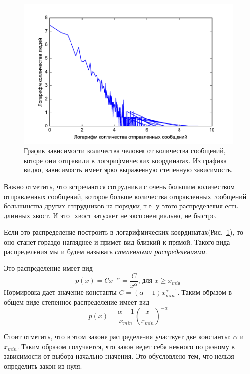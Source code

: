 \begin{figure}[H]
 \includegraphics{recources/mailes_by_people_enron}
 \caption{График зависимости количества человек от количества сообщений, которе они отправили в логарифмических координатах. Из графика видно, зависимость имеет ярко выраженную степенную зависимость.}
 \label{fig:enron_mails_by_people}
\end{figure}

Важно отметить, что встречаются сотрудники с очень большим количеством отправленных сообщений, которое больше количества отправленных сообщений большинства других сотрудников на порядки, т.е. у этого распределения есть длинных хвост. И этот хвост затухает не экспоненциально, не быстро. 

Если это распределение построить в логарифмических координатах(Рис.~\ref{fig:enron_mails_by_people}), то оно станет гораздо нагляднее и примет вид близкий к прямой. Такого вида распределения мы и будем называть \textit{степенными распределениями}. 

Это распределение имеет вид \cite{zhukov} $$ p(x) = Cx^{-\alpha} = \frac{C}{x^\alpha} \text{, для } x \ge x_{min} $$ 
Нормировка дает значение константы $C = (\alpha - 1) x_{min}^{\alpha - 1}$.
Таким образом в общем виде степенное распределение имеет вид $$p(x) = \frac{\alpha - 1}{x_{min}} \left( \frac{x}{x_{min}} \right)^{-\alpha}$$

Стоит отметить, что в этом законе распределения участвует две константы: $\alpha$ и $x_{min}$. Таким образом получается, что закон ведет себя немного по разному в зависимости от выбора начально значения. Это обусловлено тем, что нельзя определить закон из нуля.